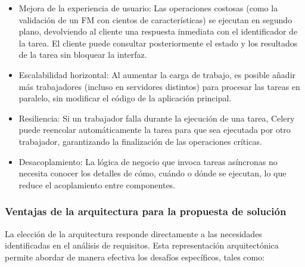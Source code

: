 \begin{itemize}
    \item Mejora de la experiencia de usuario: Las operaciones costosas (como la validación de un \ac{FM} con cientos 
	de características) se ejecutan en segundo plano, devolviendo al cliente una respuesta inmediata con el 
	identificador de la tarea. El cliente puede consultar posteriormente el estado y los resultados de la 
	tarea sin bloquear la interfaz.
    
    \item Escalabilidad horizontal: Al aumentar la carga de trabajo, es posible añadir más trabajadores 
	(incluso en servidores distintos) para procesar las tareas en paralelo, sin modificar el código de la 
	aplicación principal.
    
    \item Resiliencia: Si un trabajador falla durante la ejecución de una tarea, Celery puede reencolar 
	automáticamente la tarea para que sea ejecutada por otro trabajador, garantizando la finalización de las 
	operaciones críticas.
    
    \item Desacoplamiento: La lógica de negocio que invoca tareas asíncronas no necesita conocer los detalles 
	de cómo, cuándo o dónde se ejecutan, lo que reduce el acoplamiento entre componentes.
\end{itemize}

\subsubsection{Ventajas de la arquitectura para la propuesta de solución}

La elección de la arquitectura responde directamente a las necesidades identificadas en el análisis de requisitos.
Esta representación arquitectónica permite abordar de manera efectiva los desafíos específicos, tales como:


